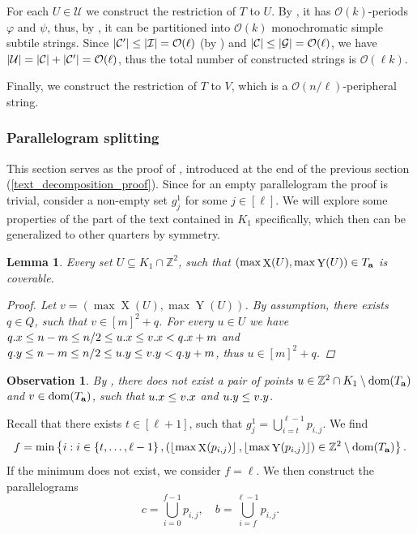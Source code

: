 \documentclass[11pt, letterpaper]{article}
\theoremstyle{plain}
\newtheorem{lemma}{Lemma}
\newtheorem{observation}{Observation}
\theoremstyle{definition}
\theoremstyle{remark}
\newcommand{\Z}{\mathbb{Z}}
\renewcommand{\O}{\mathcal{O}}
\newcommand{\U}{\mathcal{U}}
\renewcommand{\phi}{\varphi}
\newcommand{\floor}[1]{\left\lfloor #1 \right\rfloor}
\newcommand{\set}[1]{\left\lbrace #1 \right\rbrace}
\DeclareMathOperator*{\X}{X}
\DeclareMathOperator*{\Y}{Y}
\begin{document}
For each $U \in \U$ we construct the restriction of $T$ to $U$.
By , it has $\O(k)$-periods $\phi$ and $\psi$, thus, by , it can be partitioned into $\O(k)$ monochromatic simple subtile strings.
Since $|\C'| \le |\I| = \O(\ell)$ (by ) and $|\C| \le |\G| = \O(\ell)$, we have $|\U| = |\C| + |\C'| = \O(\ell)$, thus the total number of constructed strings is $\O(\ell k)$.

Finally, we construct the restriction of $T$ to $V$, which is a $\O(n / \ell)$-peripheral string.


\subsubsection{Parallelogram splitting} \label{parallelogram_split_lemma_proof}

This section serves as the proof of , introduced at the end of the previous section (\ref{text_decomposition_proof}).
Since for an empty parallelogram the proof is trivial, consider a non-empty set $g^1_j$ for some $j \in [\ell]$.
We will explore some properties of the part of the text contained in $K_1$ specifically, which then can be generalized to other quarters by symmetry.

\begin{lemma}\label{coverability_condition}
	Every set $U \subseteq K_1 \cap \Z^2$, such that $(\max \X(U), \max \Y(U)) \in \Ta$ is coverable.
	\begin{proof}
		Let $v = (\max \X(U), \max \Y(U))$.
		By assumption, there exists $q \in Q$, such that $v \in [m]^2 + q$.
		For every $u \in U$ we have
		$q.x \le n - m \le n / 2 \le u.x \le v.x < q.x + m$
		and $q.y \le n - m \le n / 2 \le u.y \le v.y < q.y + m$,
		thus $u \in [m]^2 + q$.
	\end{proof}
\end{lemma}

\begin{observation}\label{domination_lemma}
	By , there does not exist a pair of points $u \in \Z^2 \cap K_1 \setminus \d{\Ta}$ and $v \in \operatorname*{dom}(T_\mathbf{a})$, such that $u.x \le v.x$ and $u.y \le v.y$. 
\end{observation}

Recall that there exists $t \in [\ell + 1]$, such that
$ g^1_j = \bigcup_{i = t}^{\ell - 1} p_{i, j}.$
We find 
\[ f = \min\set{i : i \in \set{t, \dots, \ell - 1}, (\floor{\max \X(p_{i, j})}, \floor{\max \Y(p_{i, j})}) \in \Z^2 \setminus \d{\Ta}}.\]
If the minimum does not exist, we consider $f = \ell$.
We then construct the parallelograms
\[c = \bigcup_{i = 0}^{f - 1} p_{i, j}, \quad b = \bigcup_{i = f}^{\ell - 1} p_{i, j}.\]
\end{document}
